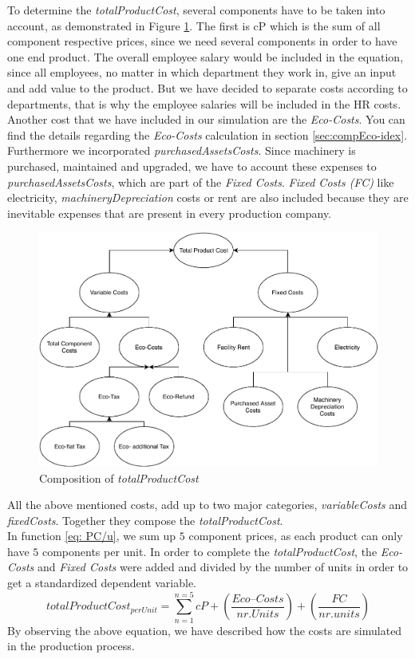 To determine the \textit{totalProductCost}, several components have to be taken into account, as demonstrated in Figure \ref{fig:productionCosts}. The first is cP %
which is the sum of all component respective prices, since we need several components in order to have one end product. The overall employee salary would be included in the equation, since all employees, no matter in which department they work in, give an input and add value to the product. But we have decided to separate costs according to departments, that is why the employee salaries will be included in the HR costs. Another cost that we have included in our simulation are the \textit{Eco-Costs}. You can find the details regarding the \textit{Eco-Costs} calculation in section \ref{sec:compEco-idex}. Furthermore we incorporated \textit{purchasedAssetsCosts}. 
Since machinery is purchased, maintained and upgraded, we have to account these expenses to \textit{purchasedAssetsCosts}, which are part of the \textit{Fixed Costs}. \textit{Fixed Costs (FC)} like electricity, \textit{machineryDepreciation} costs or rent are also included because they are inevitable expenses that are present in every production company. 

\begin{figure}[ht]
	\centering
		\includegraphics[scale=0.55]{images/ProductCost.pdf}
	\caption{Composition of \textit{totalProductCost}}
	\label{fig:productionCosts}
\end{figure}
All the above mentioned costs, add up to two major categories, \textit{variableCosts} and \textit{fixedCosts}. Together they compose the \textit{totalProductCost}.\\
 In function \ref{eq: PC/u}, we sum up $5$ component prices, as each product can only have $5$ components per unit. In order to complete the \textit{totalProductCost}, the \textit{Eco-Costs} and \textit{Fixed Costs} were added and divided by the number of units in order to get a standardized dependent variable.
\begin{equation}
	totalProductCost_{per Unit}= \sum_{n=1}^{n=5}cP + (\frac{Eco–Costs}{nr. Units}) + (\frac{FC}{nr. units}) 
	\label{eq: PC/u}
\end{equation}
By observing the above equation, we have described how the costs are simulated in the production process. 


